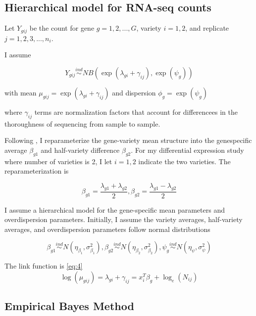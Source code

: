 \subsection{Hierarchical model for RNA-seq counts}

Let $Y_{gij}$ be the count for gene $g=1,2,..., G$, variety $i=1,2$, and replicate $j=1,2,3,...,n_i$.

I assume

\begin{equation}
\label{eq:1}
Y_{gij} \stackrel{ind}{\sim} NB(\exp(\lambda_{gi}+\gamma_{ij}), \exp(\psi_g))
\end{equation}

with mean $\mu_{gij} = \exp{(\lambda_{gi}+\gamma_{ij})}$ and dispersion $\phi_g = \exp{(\psi_g)}$

where $\gamma_{ij}$ terms are normalization factors that account for differencees in the thoroughness of sequencing from sample to sample. 

Following \citep{ji2014estimation}, I reparameterize the gene-variety mean structure into the genespecific average $\beta_{g1}$ and half-variety difference $\beta_{g2}$. For my differential expression study where number of varieties is 2, I let $i=1,2$ indicate the two varieties. The reparameterization is

\begin{equation}
\label{eq:2}
\beta_{g1} = \frac{\lambda_{g1}+\lambda_{g2}}{2}, \beta_{g2} = \frac{\lambda_{g1}-\lambda_{g2}}{2}
\end{equation}

I assume a hierarchical model for the gene-specific mean parameters and overdispersion parameters. Initially, I assume the variety averages, half-variety averages, and overdispersion parameters follow normal distributions

\begin{equation}
\label{eq:3}
\beta_{g1} \stackrel{ind}{\sim} N(\eta_{\beta_1}, \sigma^2_{\beta_1}), \beta_{g2} \stackrel{ind}{\sim} N(\eta_{\beta_2} , \sigma^2_{\beta_2}), \psi_g \stackrel{ind}{\sim} N(\eta_\psi, \sigma^2_\psi)
\end{equation}

The link function is \ref{eq:4}
\begin{equation}
\label{eq:4}
\log(\mu_{gij}) = \lambda_{gi} + \gamma_{ij} = x_i^T \beta_g + \log_e (N_{ij})
\end{equation}


\subsection{Empirical Bayes Method}

